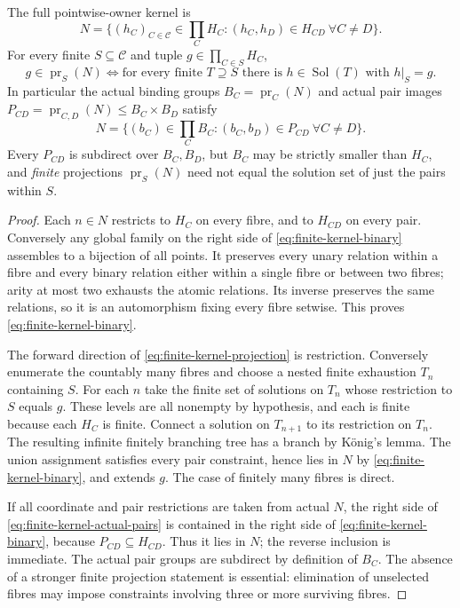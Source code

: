 \begin{theorem}
\label{thm:finite-fibre-kernel-csp}
The full pointwise-owner kernel is
\[
 \boxed{\quad N=
   \{(h_C)_{C\in\mathcal C}\in\prod_CH_C:
             (h_C,h_D)\in H_{CD}\ \forall C\ne D\}.
   \quad}\tag{FC1}\label{eq:finite-kernel-binary}
\]
For every finite $S\subseteq\mathcal C$ and tuple
$g\in\prod_{C\in S}H_C$,
\[
 \boxed{\quad
 g\in\operatorname{pr}_S(N)
 \Longleftrightarrow
 \text{for every finite }T\supseteq S
 \text{ there is }h\in\operatorname{Sol}(T)
 \text{ with }h|_S=g.
 \quad}\tag{FC2}\label{eq:finite-kernel-projection}
\]
In particular the actual binding groups
$B_C=\operatorname{pr}_C(N)$ and actual pair images
$P_{CD}=\operatorname{pr}_{C,D}(N)\le B_C\times B_D$
satisfy
\[
 N=\{(b_C)\in\prod_CB_C:
                (b_C,b_D)\in P_{CD}\ \forall C\ne D\}.
 \tag{FC3}\label{eq:finite-kernel-actual-pairs}
\]
Every $P_{CD}$ is subdirect over $B_C,B_D$, but
$B_C$ may be strictly smaller than $H_C$, and
\emph{finite} projections $\operatorname{pr}_S(N)$
need not equal the solution set of just the pairs
within $S$.
\end{theorem}
\begin{proof}
Each $n\in N$ restricts to $H_C$ on every fibre,
and to $H_{CD}$ on every pair. Conversely any
global family on the right side of \eqref{eq:finite-kernel-binary}
assembles to a bijection of all points. It preserves
every unary relation within a fibre and every binary
relation either within a single fibre or between
two fibres; arity at most two exhausts the atomic
relations. Its inverse preserves the same relations,
so it is an automorphism fixing every fibre setwise.
This proves \eqref{eq:finite-kernel-binary}.

The forward direction of \eqref{eq:finite-kernel-projection}
is restriction. Conversely enumerate the countably many
fibres and choose a nested finite exhaustion $T_n$
containing $S$. For each $n$ take the finite set
of solutions on $T_n$ whose restriction to $S$
equals $g$. These levels are all nonempty by
hypothesis, and each is finite because each $H_C$
is finite. Connect a solution on $T_{n+1}$
to its restriction on $T_n$. The resulting
infinite finitely branching tree has a branch
by K\"onig's lemma. The union assignment
satisfies every pair constraint, hence lies in
$N$ by \eqref{eq:finite-kernel-binary}, and extends
$g$. The case of finitely many fibres is direct.

If all coordinate and pair restrictions are taken
from actual $N$, the right side of
\eqref{eq:finite-kernel-actual-pairs} is contained
in the right side of \eqref{eq:finite-kernel-binary},
because $P_{CD}\subseteq H_{CD}$. Thus it lies
in $N$; the reverse inclusion is immediate.
The actual pair groups are subdirect by definition
of $B_C$. The absence of a stronger finite
projection statement is essential: elimination
of unselected fibres may impose constraints
involving three or more surviving fibres.
\end{proof}

